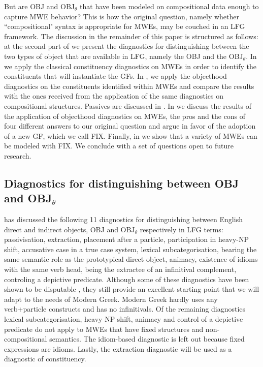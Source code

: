 \documentclass[output=paper]{langsci/langscibook}
\begin{document}
But are OBJ and OBJ$_\theta$ that have been modeled on compositional data enough to capture MWE behavior? This is how the original question, namely whether ``compositional" syntax is appropriate for MWEs, may be couched in an LFG framework. The discussion in the remainder of this paper is structured as follows: at the second part of  we present the diagnostics for distinguishing between the two types of object that are available in LFG, namely the OBJ and the OBJ$_\theta$. In  we apply the classical constituency diagnostics on MWEs in order to identify the constituents that will instantiate the GFs. In , we apply the objecthood diagnostics on the constituents identified within MWEs and compare the results with the ones received from the application of the same diagnostics on compositional structures. Passives are discussed in . In  we discuss the results of the application of objecthood diagnostics on MWEs, the pros and the cons of four different answers to our original question and argue in favor of the adoption of a new GF, which we call FIX. Finally, in  we show that a  variety of MWEs can be modeled with FIX. We conclude with a set of questions open to future research.


\largerpage
\subsection{Diagnostics for distinguishing between OBJ and OBJ$_\theta$ }


\citet{hudson1992} has discussed the following 11 diagnostics for distinguishing between English direct and indirect objects, OBJ and OBJ$_\theta$  respectively in LFG terms: passivisation, extraction, placement after a particle, participation in heavy-NP shift, accusative case in a true case system, lexical subcategorisation, bearing the same semantic role as the prototypical direct object, animacy, existence of idioms with the same verb head, being the extractee of an infinitival complement, controling a depictive predicate.  Although some of these diagnostics have been shown to be disputable \citep{thomas2012},  they still provide an excellent starting point that we will adapt to the needs of Modern Greek.  Modern Greek hardly uses any verb+particle constructs and has no infinitivals. Of the remaining diagnostics lexical subcategorisation, heavy NP shift, animacy and control of a depictive predicate do not apply to MWEs that have fixed structures and non-compositional semantics. The idiom-based diagnostic is left out because fixed expressions are idioms. Lastly, the extraction diagnostic will be used as a diagnostic of constituency. 
\end{document}

